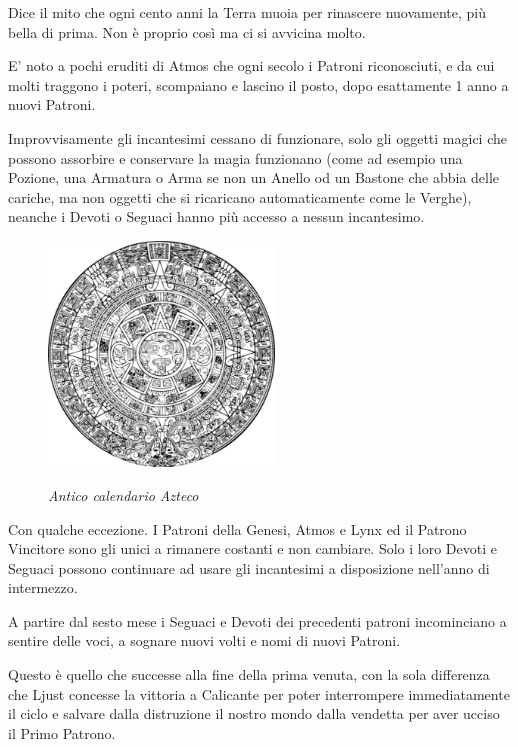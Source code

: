 \begin{multicols}{2}

Dice il mito che ogni cento anni la Terra muoia per rinascere nuovamente, più bella di prima. Non è proprio così ma ci si avvicina molto.

E' noto a pochi eruditi di Atmos che ogni secolo i Patroni riconosciuti, e da cui molti traggono i poteri, scompaiano e lascino il posto, dopo esattamente 1 anno a nuovi Patroni.

Improvvisamente gli incantesimi cessano di funzionare, solo gli oggetti magici che possono assorbire e conservare la magia funzionano (come ad esempio una Pozione, una Armatura o Arma se non un Anello od un Bastone che abbia delle cariche, ma non oggetti che si ricaricano automaticamente come le Verghe), neanche i Devoti o Seguaci hanno più accesso a nessun incantesimo.

\begin{figure}

\centering
\includegraphics[width=6cm]{immagini/Aztec_calendar.png}

\medskip

\emph{Antico calendario Azteco}
\end{figure}

Con qualche eccezione. I Patroni della Genesi, Atmos e Lynx ed il Patrono Vincitore sono gli unici a rimanere costanti e non cambiare. Solo i loro Devoti e Seguaci possono continuare ad usare gli incantesimi a disposizione nell'anno di intermezzo.

A partire dal sesto mese i Seguaci e Devoti dei precedenti patroni incominciano a sentire delle voci, a sognare nuovi volti e nomi di nuovi Patroni.

Questo è quello che successe alla fine della prima venuta, con la sola differenza che Ljust concesse la vittoria a Calicante per poter interrompere immediatamente il ciclo e salvare dalla distruzione il nostro mondo dalla vendetta per aver ucciso il Primo Patrono.


\end{multicols}
